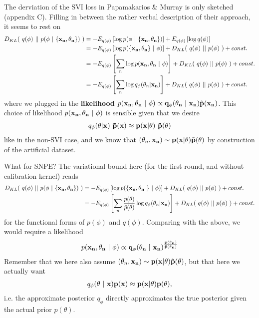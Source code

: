 \documentclass[10pt,english]{article}
\begin{document}
The derviation of the SVI loss in Papamakarios \& Murray is only sketched (appendix C). 
Filling in between the rather verbal description of their approach, it seems to rest on 
\begin{align}
D_{KL}( \ q(\phi) \ || \ p(\phi \ | \ \{\bf{x}_n, \theta_n\}) \ ) &= - E_{q(\phi)}\left[ \log p(\phi \ | \ \{\bf{x}_n, \theta_n\}) \right]  + E_{q(\phi)}\left[ \log q(\phi) \right] \nonumber \\
&= - E_{q(\phi)}\left[ \log p( \{\bf{x}_n, \theta_n\} \ | \ \phi) \right]  + D_{KL}( \ q(\phi) \ || \ p(\phi) \ )  + const. \nonumber \\
&= - E_{q(\phi)}\left[ \sum_n \log p( \bf{x}_n, \theta_n \ | \ \phi) \right]  + D_{KL}( \ q(\phi) \ || \ p(\phi) \ )  + const. \nonumber \\
&= - E_{q(\phi)}\left[ \sum_n \log q_\phi( \theta_n | \bf{x}_n) \right]  + D_{KL}( \ q(\phi) \ || \ p(\phi) \ )  + const. \nonumber
\end{align}
where we plugged in the \textbf{likelihood} $p( \bf{x}_n, \theta_n \ | \ \phi) \propto q_\phi(\theta_n \ | \ \bf{x}_n) \tilde{p}(\bf{x}_n)$. 
This choice of likelihood $p( \bf{x}_n, \theta_n \ | \ \phi)$ is sensible given that we desire
\begin{align}
q_\phi(\theta | \bf{x}) \ \tilde{p}(\bf{x}) \approx p(x |\theta) \ \tilde{p}(\theta) \nonumber
\end{align}
like in the non-SVI case, and we know that $(\theta_n, \bf{x}_n) \sim p(x|\theta)\tilde{p}(\theta)$ by construction of the artificial dataset.



\noindent{}What for SNPE? The variational bound here (for the first round, and without calibration kernel) reads 
\begin{align}
D_{KL}( \ q(\phi) \ || \ p(\phi \ | \ \{\bf{x}_n, \theta_n\}) \ ) &= - E_{q(\phi)}\left[ \log p( \{ \bf{x}_n, \theta_n \ \} \ | \ \phi) \right]  + D_{KL}( \ q(\phi) \ || \ p(\phi) \ )  + const. \nonumber \\
&= - E_{q(\phi)}\left[ \sum_n \frac{p(\theta)}{\tilde{p}(\theta)}\log q_\phi( \theta_n | \bf{x}_n) \right]  + D_{KL}( \ q(\phi) \ || \ p(\phi) \ )  + const. \nonumber
\end{align}
for the functional forms of $p(\phi)$ and $q(\phi)$. 
Comparing with the above, we would require a likelihood 
\begin{align}
p( \bf{x}_n, \theta_n \ | \ \phi) \propto q_\phi(\theta_n \ | \ \bf{x}_n)^\frac{p(\theta_n)}{\tilde{p}(\theta_n)} 
\end{align}
Remember that we here also assume $(\theta_n, \bf{x}_n) \sim p(x|\theta)\tilde{p}(\theta)$, but that here we actually want
\begin{align}
q_\phi(\theta \ | \ \bf{x}) p(\bf{x}) \approx p(x |\theta) p(\theta), \nonumber
\end{align}
i.e. the approximate posterior $q_\phi$ directly approximates the true posterior given the actual prior $p(\theta)$.
\end{document}
